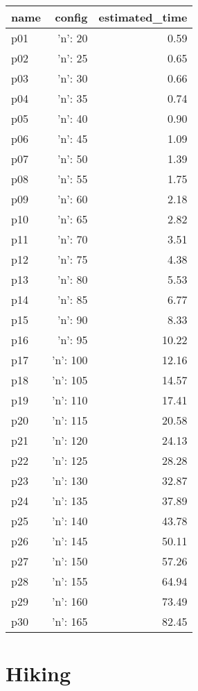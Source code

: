 \documentclass{article}
\begin{document}
                            \begin{center}
                            \scriptsize
                            \begin{tabular}{@{}l|r|r@{}}
                            name & config & estimated\_time\\\midrule
                              p01&{'n': 20}&0.59\\
  p02&{'n': 25}&0.65\\
  p03&{'n': 30}&0.66\\
  p04&{'n': 35}&0.74\\
  p05&{'n': 40}&0.90\\
  p06&{'n': 45}&1.09\\
  p07&{'n': 50}&1.39\\
  p08&{'n': 55}&1.75\\
  p09&{'n': 60}&2.18\\
  p10&{'n': 65}&2.82\\
  p11&{'n': 70}&3.51\\
  p12&{'n': 75}&4.38\\
  p13&{'n': 80}&5.53\\
  p14&{'n': 85}&6.77\\
  p15&{'n': 90}&8.33\\
  p16&{'n': 95}&10.22\\
  p17&{'n': 100}&12.16\\
  p18&{'n': 105}&14.57\\
  p19&{'n': 110}&17.41\\
  p20&{'n': 115}&20.58\\
  p21&{'n': 120}&24.13\\
  p22&{'n': 125}&28.28\\
  p23&{'n': 130}&32.87\\
  p24&{'n': 135}&37.89\\
  p25&{'n': 140}&43.78\\
  p26&{'n': 145}&50.11\\
  p27&{'n': 150}&57.26\\
  p28&{'n': 155}&64.94\\
  p29&{'n': 160}&73.49\\
  p30&{'n': 165}&82.45
                            \end{tabular}
                            \end{center}
                    
                            \newpage \section{Hiking}
\end{document}
